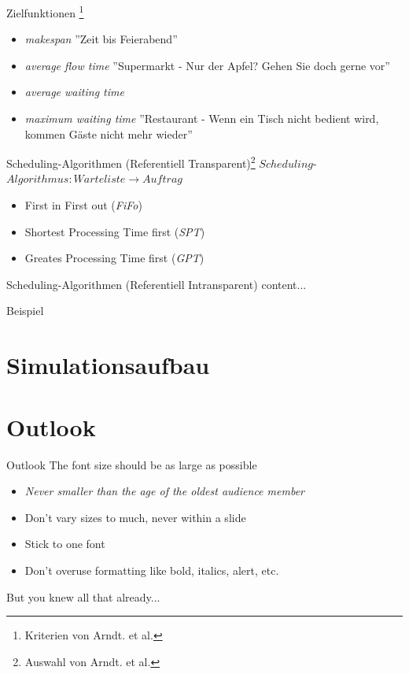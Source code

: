 \documentclass[aspectratio=169,10pt]{beamer}
\begin{document}
\begin{frame}[t,fragile]{Zielfunktionen \footnote{Kriterien von Arndt. et al.}}
\begin{itemize}[<+->]
	\item \emph{makespan} ''Zeit bis Feierabend''
	\item \emph{average flow time} ''Supermarkt - Nur der Apfel? Gehen Sie doch gerne vor''
	\item \emph{average waiting time} 	
	\item \emph{maximum waiting time} ''Restaurant - Wenn ein Tisch nicht bedient wird, kommen G\"aste nicht mehr wieder''
\end{itemize}
\end{frame}

\begin{frame}[t, fragile]{Scheduling-Algorithmen (Referentiell Transparent)\footnote{Auswahl von Arndt. et al.}} 
$Scheduling$-$Algorithmus : Warteliste \rightarrow Auftrag$\\
\pause

\begin{itemize}[<+->]
	\item First in First out (\emph{FiFo})
	\item Shortest Processing Time first (\emph{SPT})
	\item Greates Processing Time first (\emph{GPT})
\end{itemize}
\end{frame}

\begin{frame}[t, fragile]{Scheduling-Algorithmen (Referentiell Intransparent)}
	content...
\end{frame}

\begin{frame}[t,fragile]{Beispiel}
\end{frame}

\section{Simulationsaufbau}

\section{Outlook}
\begin{frame}{Outlook}
\Large
The font size should be as large as possible
\begin{itemize}
\item \textit{Never smaller than the age of the oldest audience member}
\item Don't vary sizes to much, never within a slide
\item Stick to one font
\item Don't overuse formatting like bold, italics, alert, etc.
\end{itemize}
But you knew all that already...
\end{frame}
\end{document}
